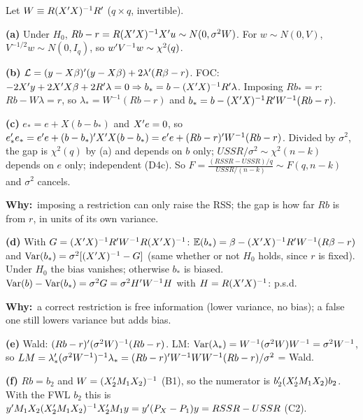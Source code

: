 \documentclass[11pt]{article}
\newcommand{\step}[1]{\par\smallskip\noindent\textbf{\textcolor{qnavy}{#1}}\quad\ignorespaces}
\newcommand{\Why}{\textbf{\textcolor{whyline}{Why:}}\ }
\begin{document}
\begin{solbox}
Let $W\equiv R(X^{\prime} X)^{-1}R^{\prime}$ ($q\times q$, invertible).
\step{(a)} Under $H_{0}$, $Rb-r=R(X^{\prime} X)^{-1}X^{\prime} u\sim N(0,\sigma^{2}W)$. For $w\sim N(0,V)$, $V^{-1/2}w\sim N(0,I_{q})$, so $w^{\prime} V^{-1}w\sim\chi^{2}(q)$.
\step{(b)} $\mathcal L=(y-X\beta)^{\prime}(y-X\beta)+2\lambda^{\prime}(R\beta-r)$. FOC: $-2X^{\prime} y+2X^{\prime} X\beta+2R^{\prime}\lambda=0\Rightarrow b_{*}=b-(X^{\prime} X)^{-1}R^{\prime}\lambda$.
Imposing $Rb_{*}=r$: $Rb-W\lambda=r$, so
$\lambda_{*}=W^{-1}(Rb-r)$ and $b_{*}=b-(X^{\prime} X)^{-1}R^{\prime} W^{-1}(Rb-r)$.
\step{(c)} $e_{*}=e+X(b-b_{*})$ and $X^{\prime} e=0$, so
$e_{*}^{\prime} e_{*}=e^{\prime} e+(b-b_{*})^{\prime} X^{\prime} X(b-b_{*})=e^{\prime} e+(Rb-r)^{\prime} W^{-1}(Rb-r)$.
Divided by $\sigma^{2}$, the gap is $\chi^{2}(q)$ by (a) and depends on $b$ only; $USSR/\sigma^{2}\sim\chi^{2}(n-k)$ depends on $e$ only; independent (D4c). So
$F=\frac{(RSSR-USSR)/q}{USSR/(n-k)}\sim F(q,n-k)$ and $\sigma^{2}$ cancels.
\begin{why}\Why imposing a restriction can only raise the RSS; the gap is how far $Rb$ is from $r$, in units of its own variance.\end{why}
\step{(d)} With $G=(X^{\prime} X)^{-1}R^{\prime} W^{-1}R(X^{\prime} X)^{-1}$:
$\mathbb{E}(b_{*})=\beta-(X^{\prime} X)^{-1}R^{\prime} W^{-1}(R\beta-r)$ and $\operatorname{Var}(b_{*})=\sigma^{2}[(X^{\prime} X)^{-1}-G]$ (same whether or not $H_{0}$ holds, since $r$ is fixed).
Under $H_{0}$ the bias vanishes; otherwise $b_{*}$ is biased. $\operatorname{Var}(b)-\operatorname{Var}(b_{*})=\sigma^{2}G=\sigma^{2}H^{\prime} W^{-1}H$ with $H=R(X^{\prime} X)^{-1}$: p.s.d.
\begin{why}\Why a correct restriction is free information (lower variance, no bias); a false one still lowers variance but adds bias.\end{why}
\step{(e)} Wald: $(Rb-r)^{\prime}(\sigma^{2}W)^{-1}(Rb-r)$. LM: $\operatorname{Var}(\lambda_{*})=W^{-1}(\sigma^{2}W)W^{-1}=\sigma^{2}W^{-1}$, so
$LM=\lambda_{*}^{\prime}(\sigma^{2}W^{-1})^{-1}\lambda_{*}=(Rb-r)^{\prime} W^{-1}WW^{-1}(Rb-r)/\sigma^{2}$ = Wald.
\step{(f)} $Rb=b_{2}$ and $W=(X_{2}^{\prime} M_{1}X_{2})^{-1}$ (B1), so the numerator is $b_{2}^{\prime}(X_{2}^{\prime} M_{1}X_{2})b_{2}$. With the FWL $b_{2}$ this is
$y^{\prime} M_{1}X_{2}(X_{2}^{\prime} M_{1}X_{2})^{-1}X_{2}^{\prime} M_{1}y=y^{\prime}(P_{X}-P_{1})y=RSSR-USSR$ (C2).
\end{solbox}
\end{document}
